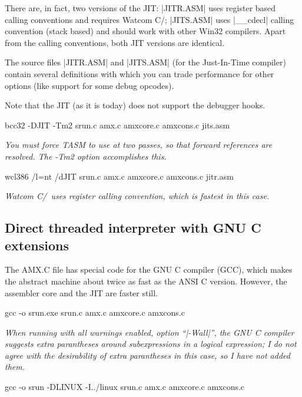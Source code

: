 There are, in fact, two versions of the JIT: |JITR.ASM| uses register based
calling conventions and requires Watcom C/\Cpp; |JITS.ASM| uses |__cdecl|
calling convention (stack based) and should work with other Win32
compilers. Apart from the calling conventions, both JIT versions are
identical.

The source files |JITR.ASM| and |JITS.ASM| (for the Just-In-Time compiler)
contain several definitions with which you can trade performance for other
options (like support for some debug opcodes).

 
Note that the JIT (as it is today) does not support the debugger hooks.

\beginlist{40pt}
 \lbreak
        {\smalltt bcc32 -DJIT -Tm2 srun.c amx.c amxcore.c amxcons.c jits.asm}

        {\it You must force TASM to use at two passes, so that forward
        references are resolved. The -Tm2 option accomplishes this.}

 \lbreak
        {\smalltt wcl386 /l=nt /dJIT srun.c amx.c amxcore.c amxcons.c jitr.asm}

        {\it Watcom C/\Cpp\ uses register calling convention, which is fastest
        in this case.}
\endlist


\subsection{Direct threaded interpreter with GNU C extensions}
 
The AMX.C file has special code for the GNU C compiler (GCC), which makes
the abstract machine about twice as fast as the ANSI C version. However,
the assembler core and the JIT are faster still.

\beginlist{40pt}
 \lbreak
        {\smalltt gcc -o srun.exe srun.c amx.c amxcore.c amxcons.c}

        {\it When running with all warnings enabled, option ``|-Wall|'', the GNU
        C compiler suggests extra parantheses around subexpressions in a
        logical expression; I do not agree with the desirability of extra
        parantheses in this case, so I have not added them.}

 \lbreak
        {\smalltt gcc -o srun -DLINUX -I../linux srun.c amx.c amxcore.c amxcons.c}

